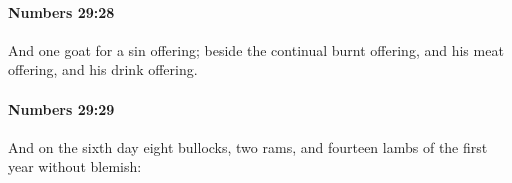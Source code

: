 		\paragraph{Numbers 29:28} %
			\label{NUMBERS-29-28}

			And one goat for a sin offering; beside the continual burnt offering, and his meat offering, and his drink offering.


		\paragraph{Numbers 29:29} %
			\label{NUMBERS-29-29}

			And on the sixth day eight bullocks, two rams, and fourteen lambs of the first year without blemish:



